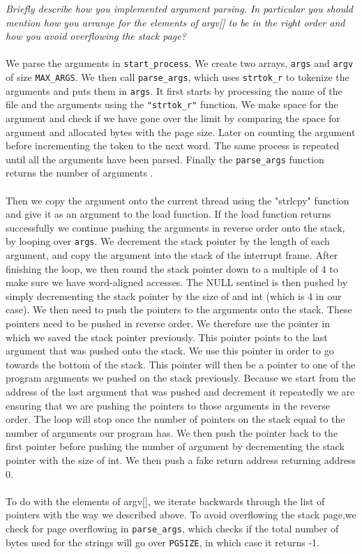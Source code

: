 \documentclass{article}
\begin{document}
\textit{Briefly describe how you implemented argument parsing. In particular you
should mention how you arrange for the elements of argv[] to be in the right
order and how you avoid overflowing the stack page?}
\\ \\
We parse the arguments in \texttt{start\_process}. We create two arrays, \texttt{args} and \texttt{argv} of size \texttt{MAX\_ARGS}. We then call \texttt{parse\_args}, which uses \texttt{strtok\_r} to tokenize the arguments and puts them in \texttt{args}. It first starts by processing the name of the file and the arguments using the \texttt{"strtok\_r"} function. We make space for the argument and check if we have gone over the limit by comparing the space for argument and allocated bytes with the page size. Later on counting the argument before incrementing the token to the next word. The same process is repeated until all the arguments have been parsed. Finally the \texttt{parse\_args} function returns the number of arguments .
\\ \\
Then we copy the argument onto the current thread using the "strlcpy"  function and give it as an argument to the load function. If the load function returns successfully we continue pushing the arguments in reverse order onto the stack, by looping over \texttt{args}. We  decrement the stack pointer by the length of each argument, and copy the argument into  the stack of the interrupt frame. After finishing the loop, we then round the stack pointer down to a multiple of 4 to make sure we have word-aligned accesses. The NULL sentinel is then pushed by simply decrementing the stack pointer by the size of and int (which is 4 in our case). We then need to push the pointers to the arguments onto the stack. These pointers need to be pushed in reverse order. We therefore use the pointer in which we saved the stack pointer previously. This pointer points to the last argument that was pushed onto the stack. We use this pointer in order to go towards the bottom of the stack. This pointer will then be a pointer to one of the program arguments we pushed on the stack previously. Because we start from the address of the last argument that was pushed and decrement it repeatedly we are ensuring that we are pushing the pointers to those arguments in the reverse order. The loop will stop once the number of pointers on the stack equal to the number of arguments our program has. We then push the pointer back to the first pointer before pushing the number of argument by decrementing the stack pointer with the size of int. We then push a fake return address returning address 0.
\\ \\
To do with the elements of argv[], we iterate backwards through the list of pointers with the way we described above. To avoid overflowing the stack page,we check for page overflowing in \texttt{parse\_args}, which checks if the total number of bytes used for the strings will go over \texttt{PGSIZE}, in which case it returns -1.
\end{document}
